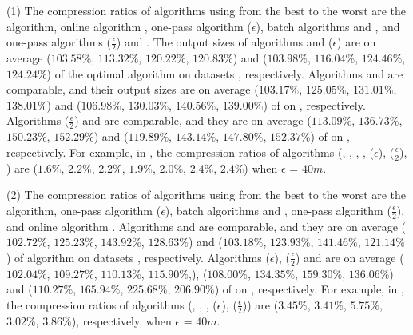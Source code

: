 \sstab(1) The compression ratios of algorithms using \ped from the best
to the worst are the \opt algorithm, online algorithm \bqsa, one-pass algorithm \siped($\epsilon$), batch algorithms \tpa and
\dpa, and one-pass algorithms \siped($\frac{\epsilon}{2}$) and \operb.
The output sizes of algorithms \bqsa and \siped({$\epsilon$}) are on average
($103.58\%$, $113.32\%$, $120.22\%$, $120.83\%$) and ($103.98\%$, $116.04\%$, $124.46\%$, $124.24\%$) of the optimal algorithm \opt
on datasets \dSets, respectively.
Algorithms \tpa and \dpa are comparable, and their output sizes are on average
($103.17\%$, $125.05\%$, $131.01\%$, $138.01\%$) and ($106.98\%$, $130.03\%$, $140.56\%$, $139.00\%$) of \opt
on \dSets, respectively.
Algorithms \siped($\frac{\epsilon}{2}$) and \operb are comparable, and they are on average
($113.09\%$, $136.73\%$, $150.23\%$, $152.29\%$)
and ($119.89\%$, $143.14\%$, $147.80\%$, $152.37\%$) of \opt on \dSets, respectively.
%
For example, in \mopsi, the compression ratios of algorithms
(\opt, \tpa, \dpa, \bqsa, \siped(${\epsilon}$), \siped($\frac{\epsilon}{2}$), \operb ) are ($1.6\%$, $2.2\%$, $2.2\%$, $1.9\%$, $2.0\%$, $2.4\%$, $2.4\%$) when $\epsilon$ = $40m$.
%

\sstab(2) The compression ratios of algorithms using \sed from the best
to the worst are the \opt algorithm, one-pass algorithm \cised($\epsilon$), batch algorithms \tpa and
\dpa, one-pass algorithm \cised($\frac{\epsilon}{2}$), and online algorithm \squishe.
%
{Algorithms \tpa and \dpa are comparable, and they are on average
($102.72\%$, $125.23\%$, $143.92\%$, $128.63\%$) and ($103.18\%$, $123.93\%$, $141.46\%$, $121.14\%$)
 of algorithm \opt on datasets \dSets, respectively.}
%
{Algorithms \cised(${\epsilon}$), \cised($\frac{\epsilon}{2}$) and \squishe are on average (
  $102.04\%$, $109.27\%$, $110.13\%$, $115.90\%$,), ($108.00\%$,
  $134.35\%$, $159.30\%$, $136.06\%$) and ($110.27\%$, $165.94\%$, $225.68\%$, $206.90\%$)
 of \opt on \dSets, respectively.}
%
For example, in \mopsi, the compression ratios of algorithms
(\tpa, \dpa, \squishe, \cised(${\epsilon}$), \cised($\frac{\epsilon}{2}$))
are ($3.45\%$, $3.41\%$, $5.75\%$, $3.02\%$, $3.86\%$), respectively, when $\epsilon$ = $40m$.
%
%
%


